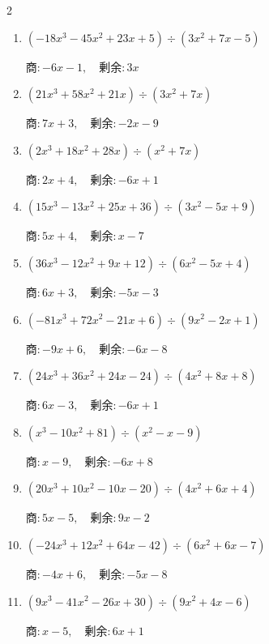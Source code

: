 \begin{multicols}{2}
\begin{enumerate}
        $商 : -7x-7, \quad 剰余 : 4x-6$

  \item $(-18x^{3}-45x^{2}+23x+5) \div (3x^{2}+7x-5)$

        $商 : -6x-1, \quad 剰余 : 3x$

  \item $(21x^{3}+58x^{2}+21x) \div (3x^{2}+7x)$

        $商 : 7x+3, \quad 剰余 : -2x-9$

\columnbreak %

\resetques

  \item $(2x^{3}+18x^{2}+28x) \div (x^{2}+7x)$

        $商 : 2x+4, \quad 剰余 : -6x+1$

  \item $(15x^{3}-13x^{2}+25x+36) \div (3x^{2}-5x+9)$

        $商 : 5x+4, \quad 剰余 : x-7$

  \item $(36x^{3}-12x^{2}+9x+12) \div (6x^{2}-5x+4)$

        $商 : 6x+3, \quad 剰余 : -5x-3$

  \item $(-81x^{3}+72x^{2}-21x+6) \div (9x^{2}-2x+1)$

        $商 : -9x+6, \quad 剰余 : -6x-8$

  \item $(24x^{3}+36x^{2}+24x-24) \div (4x^{2}+8x+8)$

        $商 : 6x-3, \quad 剰余 : -6x+1$

\columnbreak %

  \item $(x^{3}-10x^{2}+81) \div (x^{2}-x-9)$

        $商 : x-9, \quad 剰余 : -6x+8$

  \item $(20x^{3}+10x^{2}-10x-20) \div (4x^{2}+6x+4)$

        $商 : 5x-5, \quad 剰余 : 9x-2$

  \item $(-24x^{3}+12x^{2}+64x-42) \div (6x^{2}+6x-7)$

        $商 : -4x+6, \quad 剰余 : -5x-8$

  \item $(9x^{3}-41x^{2}-26x+30) \div (9x^{2}+4x-6)$

        $商 : x-5, \quad 剰余 : 6x+1$


\end{enumerate}
\end{multicols}
